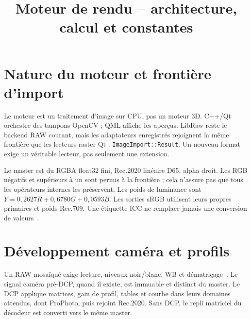 
\title{Moteur de rendu \IPR{} -- architecture, calcul et constantes}


\section{Nature du moteur et frontière d'import}
Le moteur est un traitement d'image sur CPU, pas un moteur 3D. C++/Qt
orchestre des tampons OpenCV ; QML affiche les aperçus. LibRaw reste le
backend RAW courant, mais les adaptateurs enregistrés rejoignent la même
frontière que les lecteurs raster Qt : \texttt{ImageImport::Result}.
Un nouveau format exige un véritable lecteur, pas seulement une extension.

\begin{center}
\end{center}

Le master est du RGBA float32 fini, Rec.2020 linéaire D65, alpha droit.
Les RGB négatifs et supérieurs à un sont permis à la frontière ; cela
n'assure pas que tous les opérateurs internes les préservent. Les poids
de luminance sont $Y=0{,}2627R+0{,}6780G+0{,}0593B$.
Les sorties sRGB utilisent leurs propres primaires et poids Rec.709.
Une étiquette ICC ne remplace jamais une conversion de valeurs~\cite{icc2022}.

\section{Développement caméra et profils}
Un RAW mosaïqué exige lecture, niveaux noir/blanc, WB et dématriçage~\cite{libraw}.
Le signal caméra pré-DCP, quand il existe, est immuable et distinct du master.
Le DCP applique matrices, gain de profil, tables et courbe dans leurs domaines
attendus, dont ProPhoto, puis rejoint Rec.2020. Sans DCP, le repli matriciel
du décodeur est converti vers le même master.

